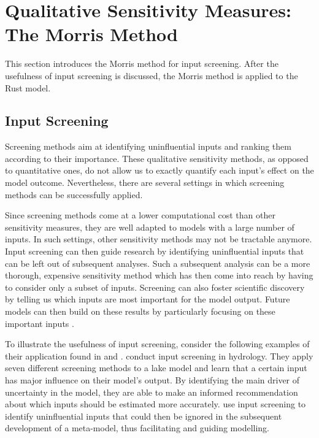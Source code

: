 \section{Qualitative Sensitivity Measures: The Morris Method} \label{comp_morris}

This section introduces the Morris method for input screening. After the usefulness of input screening is discussed, the Morris method is applied to the Rust model.

\subsection{Input Screening}

Screening methods aim at identifying uninfluential inputs and ranking them according to their importance. These qualitative sensitivity methods, as opposed to quantitative ones, do not allow us to exactly quantify each input's effect on the model outcome. Nevertheless, there are several settings in which screening methods can be successfully applied.

Since screening methods come at a lower computational cost than other sensitivity measures, they are well adapted to models with a large number of inputs. In such settings, other sensitivity methods may not be tractable anymore. Input screening can then guide research by identifying uninfluential inputs that can be left out of subsequent analyses. Such a subsequent analysis can be a more thorough, expensive sensitivity method which has then come into reach by having to consider only a subset of inputs. Screening can also foster scientific discovery by telling us which inputs are most important for the model output. Future models can then build on these results by particularly focusing on these important inputs \citep{R21}.

To illustrate the usefulness of input screening, consider the following examples of their application found in \citet{GPWMS17} and \citet{MMA18}. \citet{GPWMS17} conduct input screening in hydrology. They apply seven different screening methods to a lake model and learn that a certain input has major influence on their model's output. By identifying the main driver of uncertainty in the model, they are able to make an informed recommendation about which inputs should be estimated more accurately. \citet{MMA18} use input screening to identify uninfluential inputs that could then be ignored in the subsequent development of a meta-model, thus facilitating and guiding modelling.

